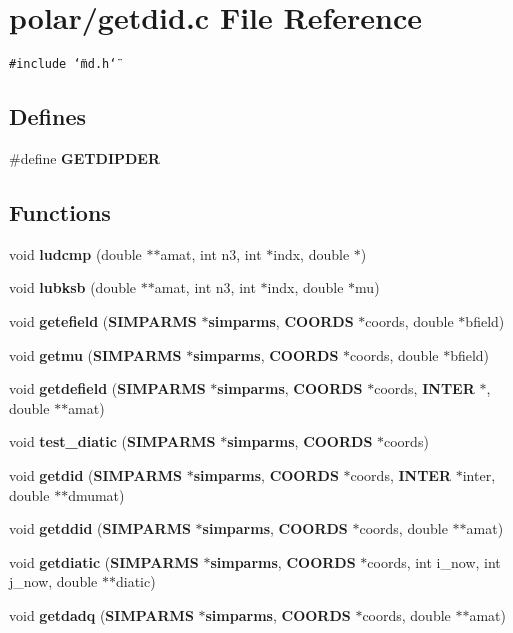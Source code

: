 \section{polar/getdid.c File Reference}
\label{polar_2getdid_8c}
{\tt \#include \char`\"{}md.h\char`\"{}}\par
\subsection*{Defines}
\begin{CompactItemize}
\item 
\#define {\bf GETDIPDER}
\end{CompactItemize}
\subsection*{Functions}
\begin{CompactItemize}
\item 
void {\bf ludcmp} (double $\ast$$\ast$amat, int n3, int $\ast$indx, double $\ast$)
\item 
void {\bf lubksb} (double $\ast$$\ast$amat, int n3, int $\ast$indx, double $\ast$mu)
\item 
void {\bf getefield} ({\bf SIMPARMS} $\ast${\bf simparms}, {\bf COORDS} $\ast$coords, double $\ast$bfield)
\item 
void {\bf getmu} ({\bf SIMPARMS} $\ast${\bf simparms}, {\bf COORDS} $\ast$coords, double $\ast$bfield)
\item 
void {\bf getdefield} ({\bf SIMPARMS} $\ast${\bf simparms}, {\bf COORDS} $\ast$coords, {\bf INTER} $\ast$, double $\ast$$\ast$amat)
\item 
void {\bf test\_\-diatic} ({\bf SIMPARMS} $\ast${\bf simparms}, {\bf COORDS} $\ast$coords)
\item 
void {\bf getdid} ({\bf SIMPARMS} $\ast${\bf simparms}, {\bf COORDS} $\ast$coords, {\bf INTER} $\ast$inter, double $\ast$$\ast$dmumat)
\item 
void {\bf getddid} ({\bf SIMPARMS} $\ast${\bf simparms}, {\bf COORDS} $\ast$coords, double $\ast$$\ast$amat)
\item 
void {\bf getdiatic} ({\bf SIMPARMS} $\ast${\bf simparms}, {\bf COORDS} $\ast$coords, int i\_\-now, int j\_\-now, double $\ast$$\ast$diatic)
\item 
void {\bf getdadq} ({\bf SIMPARMS} $\ast${\bf simparms}, {\bf COORDS} $\ast$coords, double $\ast$$\ast$amat)
\end{CompactItemize}


